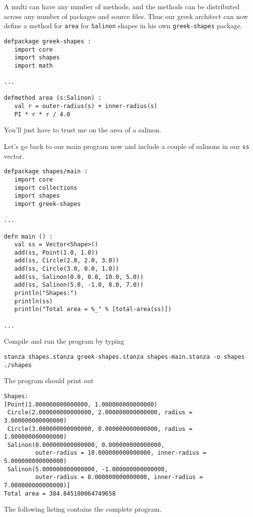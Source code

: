 \documentclass[10pt,oneside]{book}
\begin{document}
A multi can have any number of methods, and the methods can be distributed across any number of packages and source files. Thus our greek architect can now define a method for \texttt{\frenchspacing area} for \texttt{\frenchspacing Salinon} shapes in his own \texttt{\frenchspacing greek-shapes} package.
\begin{lstlisting}
defpackage greek-shapes :
   import core
   import shapes
   import math

...

defmethod area (s:Salinon) :
   val r = outer-radius(s) + inner-radius(s)
   PI * r * r / 4.0
\end{lstlisting}
You'll just have to trust me on the area of a salinon.

Let's go back to our main program now and include a couple of salinons in our \texttt{\frenchspacing ss} vector.
\begin{lstlisting}
defpackage shapes/main :
   import core
   import collections
   import shapes
   import greek-shapes

...

defn main () :
   val ss = Vector<Shape>()
   add(ss, Point(1.0, 1.0))
   add(ss, Circle(2.0, 2.0, 3.0))
   add(ss, Circle(3.0, 0.0, 1.0))
   add(ss, Salinon(0.0, 0.0, 10.0, 5.0))
   add(ss, Salinon(5.0, -1.0, 8.0, 7.0))
   println("Shapes:")
   println(ss)
   println("Total area = %_" % [total-area(ss)])

...
\end{lstlisting}

Compile and run the program by typing
\begin{lstlisting}
stanza shapes.stanza greek-shapes.stanza shapes-main.stanza -o shapes
./shapes
\end{lstlisting}

The program should print out
\begin{lstlisting}
Shapes:
[Point(1.000000000000000, 1.000000000000000)
 Circle(2.000000000000000, 2.000000000000000, radius = 3.000000000000000)
 Circle(3.000000000000000, 0.000000000000000, radius = 1.000000000000000)
 Salinon(0.000000000000000, 0.000000000000000,
         outer-radius = 10.000000000000000, inner-radius = 5.000000000000000)
 Salinon(5.000000000000000, -1.000000000000000,
         outer-radius = 8.000000000000000, inner-radius = 7.000000000000000)]
Total area = 384.845100064749658
\end{lstlisting}

The following listing contains the complete program.
\end{document}
